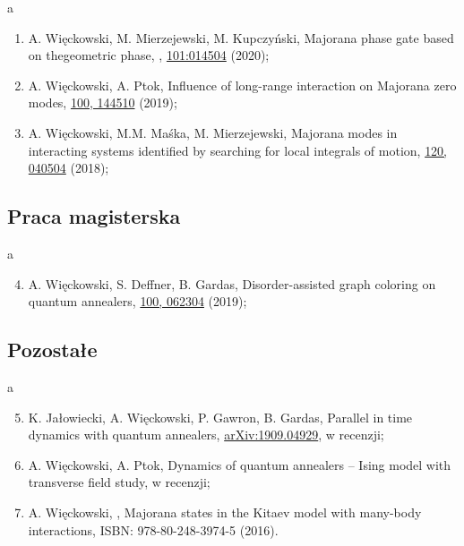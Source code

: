 \phantom a
\vspace{-10ex}

\begin{enumerate}

\item A. Więckowski, M. Mierzejewski, M. Kupczyński,
    Majorana phase gate based on thegeometric phase,
    \href{http://dx.doi.org/10.1103/PhysRevB.101.014504}{},
    \href{http://dx.doi.org/10.1103/PhysRevB.101.014504}{101:014504} (2020);

\item  A. Więckowski, A. Ptok, Influence of long-range interaction on Majorana zero modes, \href{https://journals.aps.org/prb/abstract/10.1103/PhysRevB.100.144510}{ 100, 144510} (2019);

\item A. Więckowski, M.M. Maśka, M. Mierzejewski, Majorana modes in interacting systems identified by searching for local integrals of motion, 
\href{https://journals.aps.org/prl/abstract/10.1103/PhysRevLett.120.040504}{ 120, 040504} (2018);

\end{enumerate}
\subsection*{Praca magisterska}

\phantom a
\vspace{-5ex}

\begin{enumerate}
\setcounter{enumi}{3}

\item  A. Więckowski, S. Deffner, B. Gardas, Disorder-assisted graph coloring on quantum annealers, \href{https://journals.aps.org/pra/abstract/10.1103/PhysRevA.100.062304}{ 100, 062304} (2019);


\end{enumerate}


\subsection*{Pozostałe}

\phantom a
\vspace{-5ex}

\begin{enumerate}

\setcounter{enumi}{4}

\item  K. Jałowiecki, A. Więckowski, P. Gawron, B. Gardas, Parallel in time dynamics with quantum annealers, \href{https://arxiv.org/pdf/1909.04929.pdf}{arXiv:1909.04929}, w recenzji;

\item  A. Więckowski, A. Ptok, Dynamics of quantum annealers – Ising model with transverse field study, w recenzji;

\item A. Więckowski, , Majorana states in the Kitaev model with many-body interactions, ISBN: 978-80-248-3974-5 (2016).
\end{enumerate}

